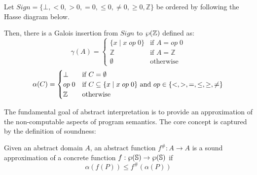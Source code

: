 \documentclass[
  10pt,       %
  twoside,    %
  a4paper,    %
  english,    %
  tikz,       %
  openright,  %
]{book}
\begin{document}
\begin{example}
  \label{exmp:sign}
  Let $Sign = \{ \bot , <0, >0, =0, \leq 0, \neq 0, \geq 0, \mathbb{Z}\}$ be 
  ordered by following the Hasse diagram below.

  \begin{center}
  \end{center}

  Then, there is a Galois insertion from $Sign$ to $\wp(\mathbb{Z})$ defined as:
  $$\gamma(A) = \begin{cases}
    \{ x \mid x \;op\; 0 \} & \text{if } A = op\;0 \\
    \mathbb{Z}              & \text{if } A = \mathbb{Z} \\
    \emptyset & \text{otherwise}
  \end{cases}$$
  $$\alpha(C) = \begin{cases}
    \bot & \text{if } C = \emptyset \\
    op \; 0 & \text{if } C \subseteq \{ x \mid x \; op \; 0 \}
        \text{ and } op \in \{<, >, =, \leq, \geq, \neq \} \\
    \mathbb{Z} & \text{otherwise}
  \end{cases}$$
\end{example}

The fundamental goal of abstract interpretation is to provide an approximation 
of the non-computable aspects of program semantics. The core concept is captured 
by the definition of soundness:

\begin{definition}[Soundness]
  Given an abstract domain $A$, an abstract function $f^\# : A \to A$ is a 
  sound approximation of a concrete function $f : \wp(\mathbb{S}) \to 
  \wp(\mathbb{S})$ if
  $$\alpha(f(P)) \leq f^\#(\alpha(P))$$
\end{definition}
\end{document}

